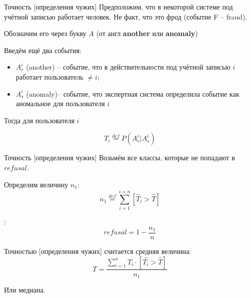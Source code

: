 \begin{frame}{Точность [определения чужих]}
	\small
	Предположим, что в некоторой системе под учётной записью 
	работает  человек.
	Не факт, что это фрод (событие F -- fraud).
	
	Обозначим его через букву $A$ (от англ \textbf{another} или \textbf{anomaly})
	
	Введём ещё два события:
	\begin{itemize}
		\item $A_r^i$ (another) -- событие, что в действительности под учётной записью $i$
		работает пользователь $\neq i$;
		\item $A_s^i$ (anomaly)-- событие, что экспертная система определила событие
		как аномальное для пользователя $i$
	\end{itemize}

	Тогда 	
	для пользователя $i$	

	\begin{equation}
	T_i \stackrel{def}{=} P (A_r^i | A_s^i)
	\end{equation}
\end{frame}

\begin{frame}{Точность [определения чужих]}
	\small
	Возьмём все классы, которые не попадают в $refusal$.
	
	Определим величину $n_1$:
	\begin{equation}
	n_1 \stackrel{def}{=} \sum_{i=1}^{i=n} \left[\hat T_i > \hat T \right]	
	\end{equation}
	
	:
	\begin{equation}
	refusal = 1 - \frac{n_1}{n}
	\end{equation}
	
	Точностью [определения чужих] считается средняя величина:
	\begin{equation}\label{eq:ueba_presicion_def}
	T = \frac{\sum_{i=1}^{n} T_i \cdot \left [\hat{T_i} > \hat T \right]}{n_1} 
	\end{equation}
	
	Или медиана.
\end{frame}

